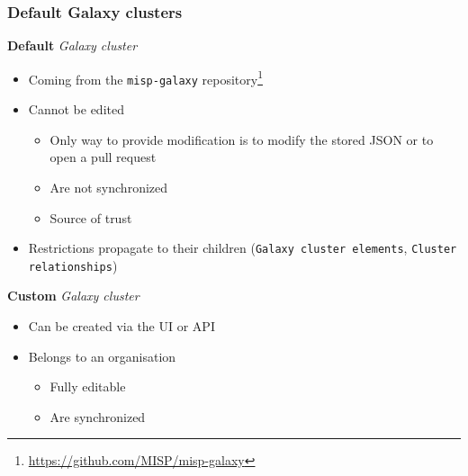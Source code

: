 \begin{frame}
    \frametitle{Default Galaxy clusters}
    {\bf Default} {\it Galaxy cluster} 
    \begin{itemize}
        \item Coming from the \texttt{misp-galaxy} repository\footnote{\url{https://github.com/MISP/misp-galaxy}}
        \item Cannot be edited
        \begin{itemize}
            \item Only way to provide modification is to modify the stored JSON or to open a pull request
            \item Are not synchronized
            \item Source of trust
        \end{itemize}
        \item Restrictions propagate to their children (\texttt{Galaxy cluster elements}, \texttt{Cluster relationships})
    \end{itemize}

    \vspace{0.5em}
    {\bf Custom} {\it Galaxy cluster} 
    \begin{itemize}
        \item Can be created via the UI or API
        \item Belongs to an organisation
        \begin{itemize}
            \item Fully editable
            \item Are synchronized
        \end{itemize}
    \end{itemize}
\end{frame}


